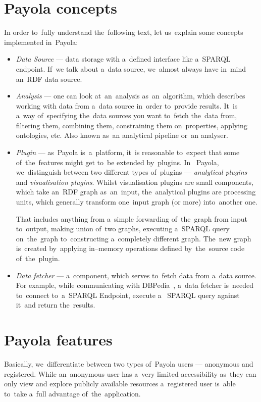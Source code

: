 \section{Payola concepts}
In order to~fully understand the~following text, let us~explain some concepts 
implemented in~Payola:
\begin{itemize}
  \item \emph{Data Source} --- data storage with a~defined interface like a~SPARQL endpoint.
  If~we talk about a~data source, we~almost always have in~mind an~RDF data source.
  
  \item \emph{Analysis} --- one can look at~an~analysis as~an~algorithm, which 
  describes working with data from a~data source in~order to~provide results. 
  It~is a~way of~specifying the~data sources you want to~fetch the~data from, 
  filtering them, combining them, constraining them on~properties, applying 
  ontologies, etc. Also known as~an analytical pipeline or~an analyser.  
  
  \item \emph{Plugin} --- as~Payola is~a~platform, it~is reasonable to~expect that 
  some of~the~features might get to~be extended by~plugins. In~  Payola, we~distinguish between two different types of~plugins --- \emph{analytical plugins} and 
  \emph{visualisation plugins}. Whilst visualisation plugins are small components, 
  which take an~RDF graph as~an~input, the~analytical plugins are processing 
  units, which generally transform one~input graph (or more) into~another one.
  
  That includes anything from a~simple forwarding of~the~graph from input to~output, 
  making union of~two graphs, executing a~SPARQL query on~the~graph to~constructing 
  a~completely different graph. The~new graph is~created by~applying in--memory
  operations defined by~the~source code of~the~plugin.
  
  \item \emph{Data fetcher} --- a~component, which serves to~fetch data from a~data 
  source. For example, while communicating with DBPedia~\cite{dbpedia},
  a~data fetcher is~needed to~connect to~a~SPARQL Endpoint, execute a~  SPARQL query against it~and return the~results.
\end{itemize}

\section{Payola features}
Basically, we~differentiate between two types of~Payola users --- anonymous and registered. 
While an~anonymous user has a~very limited accessibility as~they can only 
view and explore publicly available resources a~registered user is~able to~take a~full advantage of~the~application.

